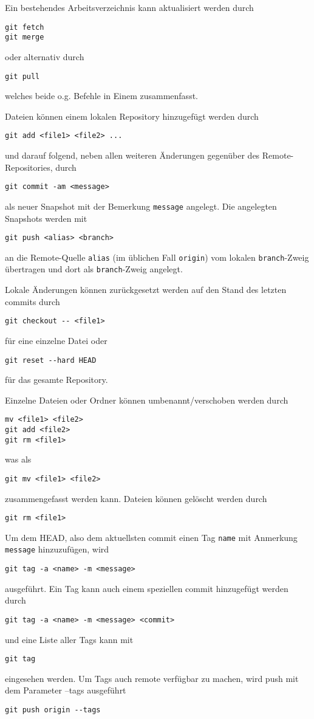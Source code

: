 \documentclass{scrartcl}
\begin{document}
Ein bestehendes Arbeitsverzeichnis kann aktualisiert werden durch
\begin{lstlisting}
git fetch
git merge
\end{lstlisting} 
oder alternativ durch 
\begin{lstlisting}
git pull
\end{lstlisting} 
welches beide o.g. Befehle in Einem zusammenfasst.

Dateien können einem lokalen Repository hinzugefügt werden durch
\begin{lstlisting}
git add <file1> <file2> ...
\end{lstlisting}
und darauf folgend, neben allen weiteren Änderungen gegenüber des Remote-Repositories, durch
\begin{lstlisting}
git commit -am <message>
\end{lstlisting}
als neuer Snapshot mit der Bemerkung \texttt{message} angelegt. Die angelegten Snapshots werden mit
\begin{lstlisting}
git push <alias> <branch>
\end{lstlisting}
an die Remote-Quelle \texttt{alias} (im üblichen Fall \texttt{origin}) vom lokalen \texttt{branch}-Zweig übertragen und dort als \texttt{branch}-Zweig angelegt.

Lokale Änderungen können zurückgesetzt werden auf den Stand des letzten commits durch
\begin{lstlisting}
git checkout -- <file1>
\end{lstlisting}
für eine einzelne Datei oder
\begin{lstlisting}
git reset --hard HEAD
\end{lstlisting}
für das gesamte Repository.

Einzelne Dateien oder Ordner können umbenannt/verschoben werden durch
\begin{lstlisting}
mv <file1> <file2>
git add <file2>
git rm <file1>
\end{lstlisting}
was als
\begin{lstlisting}
git mv <file1> <file2>
\end{lstlisting}
zusammengefasst werden kann. Dateien können gelöscht werden durch
\begin{lstlisting}
git rm <file1>
\end{lstlisting}

Um dem HEAD, also dem aktuellsten commit einen Tag \texttt{name} mit Anmerkung \texttt{message} hinzuzufügen, wird 
\begin{lstlisting}
git tag -a <name> -m <message>
\end{lstlisting}
ausgeführt. Ein Tag kann auch einem speziellen commit hinzugefügt werden durch
\begin{lstlisting}
git tag -a <name> -m <message> <commit>
\end{lstlisting}
und eine Liste aller Tags kann mit
\begin{lstlisting}
git tag
\end{lstlisting}
eingesehen werden. Um Tags auch remote verfügbar zu machen, wird push mit dem Parameter --tags ausgeführt
\begin{lstlisting}
git push origin --tags
\end{lstlisting}
\end{document}
